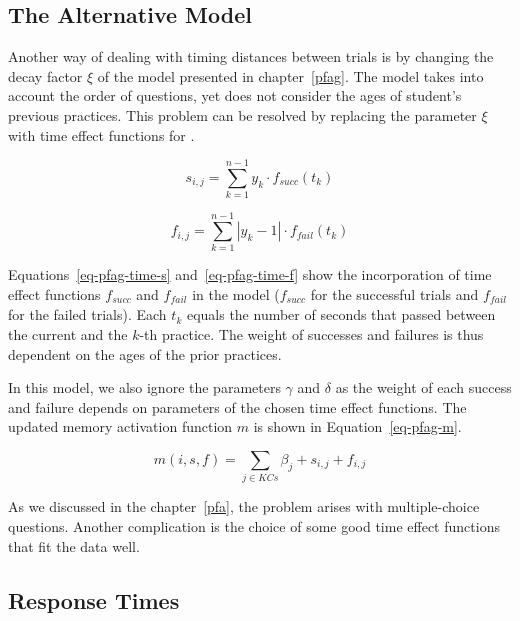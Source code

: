 \subsection{The Alternative Model}
\label{pfagt}

Another way of dealing with timing distances between trials is by changing the decay factor $\xi$ of the model presented in chapter~\ref{pfag}. The model takes into account the order of questions, yet does not consider the ages of student's previous practices. This problem can be resolved by replacing the parameter $\xi$ with time effect functions for .

\begin{equation} \label{eq-pfag-time-s}
  s_{i,j} = \sum_{k=1}^{n-1} y_k \cdot f_{\mathit{succ}}(t_k)
\end{equation}

\begin{equation} \label{eq-pfag-time-f}
  f_{i,j} = \sum_{k=1}^{n-1} |y_k - 1| \cdot f_{\mathit{fail}}(t_k)
\end{equation}

Equations~\ref{eq-pfag-time-s} and~\ref{eq-pfag-time-f} show the incorporation of time effect functions $f_{\mathit{succ}}$ and $f_{\mathit{fail}}$ in the model ($f_{\mathit{succ}}$ for the successful trials and $f_{\mathit{fail}}$ for the failed trials). Each $t_k$ equals the number of seconds that passed between the current and the $k$-th practice. The weight of successes and failures is thus dependent on the ages of the prior practices.

In this model, we also ignore the parameters $\gamma$ and $\delta$ as the weight of each success and failure depends on parameters of the chosen time effect functions. The updated memory activation function $m$ is shown in Equation~\ref{eq-pfag-m}.

\begin{equation} \label{eq-pfag-m}
  m(i,s,f) = \sum_{j \in KCs} \beta_j + s_{i,j} + f_{i,j} 
\end{equation}

As we discussed in the chapter~\ref{pfa}, the problem arises with multiple-choice questions. Another complication is the choice of some good time effect functions that fit the data well.

\subsection{Response Times}
\label{pfart}

